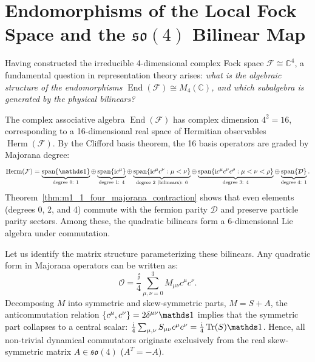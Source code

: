 \section{Endomorphisms of the Local Fock Space and the \texorpdfstring{$\mathfrak{so}(4)$}{so(4)} Bilinear Map}
\label{sec:m1_1_bilinear_representation}
Having constructed the irreducible 4-dimensional complex Fock space $\mathcal{F} \cong \mathbb{C}^4$, a fundamental question in representation theory arises: \textit{what is the algebraic structure of the endomorphisms $\operatorname{End}(\mathcal{F}) \cong M_4(\mathbb{C})$, and which subalgebra is generated by the physical bilinears?}

The complex associative algebra $\operatorname{End}(\mathcal{F})$ has complex dimension $4^2 = 16$, corresponding to a 16-dimensional real space of Hermitian observables $\operatorname{Herm}(\mathcal{F})$. By the Clifford basis theorem, the 16 basis operators are graded by Majorana degree:
\begin{equation}
\label{eq:m1_1_clifford_basis_decomposition}
\operatorname{Herm}(\mathcal{F}) = \underbrace{\operatorname{span}\{\Id\}}_{\text{degree 0: } 1} \oplus \underbrace{\operatorname{span}\{\ii c^\mu\}}_{\text{degree 1: } 4} \oplus \underbrace{\operatorname{span}\{\ii c^\mu c^\nu : \mu < \nu\}}_{\text{degree 2 (bilinears): } 6} \oplus \underbrace{\operatorname{span}\{\ii c^\mu c^\nu c^\rho : \mu < \nu < \rho\}}_{\text{degree 3: } 4} \oplus \underbrace{\operatorname{span}\{\mathcal{D}\}}_{\text{degree 4: } 1}.
\end{equation}
Theorem~\ref{thm:m1_1_four_majorana_contraction} shows that even elements (degrees 0, 2, and 4) commute with the fermion parity $\mathcal{D}$ and preserve particle parity sectors. Among these, the quadratic bilinears form a 6-dimensional Lie algebra under commutation.

Let us identify the matrix structure parameterizing these bilinears. Any quadratic form in Majorana operators can be written as:
\begin{equation}
\mathcal{O} = \frac{\ii}{4} \sum_{\mu, \nu=0}^3 M_{\mu\nu} c^\mu c^\nu.
\end{equation}
Decomposing $M$ into symmetric and skew-symmetric parts, $M = S + A$, the anticommutation relation $\{c^\mu, c^\nu\} = 2\delta^{\mu\nu}\Id$ implies that the symmetric part collapses to a central scalar: $\frac{\ii}{4}\sum_{\mu,\nu} S_{\mu\nu} c^\mu c^\nu = \frac{\ii}{4}\Tr(S)\Id$. Hence, all non-trivial dynamical commutators originate exclusively from the real skew-symmetric matrix $A \in \mathfrak{so}(4)$ ($A^T = -A$).

